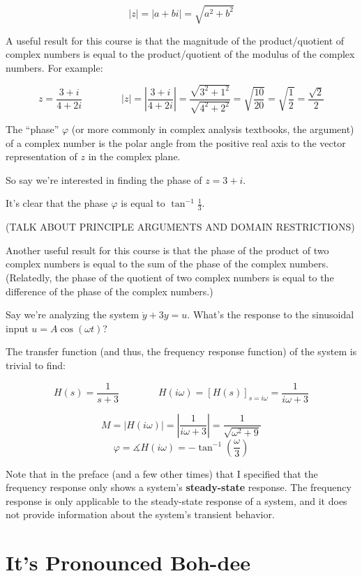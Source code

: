 \documentclass[
  letterpaper,
  DIV=11,
  numbers=noendperiod]{scrreprt}
\begin{document}
\[|z| = |a+bi| = \sqrt{a^2 + b^2}\]

A useful result for this course is that the magnitude of the
product/quotient of complex numbers is equal to the product/quotient of
the modulus of the complex numbers. For example:

\[z = \frac{3 + i}{4 + 2i} \qquad \qquad |z| = \left|\frac{3 + i}{4 + 2i} \right| = \frac{\sqrt{3^2+1^2}}{\sqrt{4^2+2^2}} = \sqrt{\frac{10}{20}} = \sqrt{\frac{1}{2}} = \frac{\sqrt{2}}{2}\]

The ``phase'' \(\varphi\) (or more commonly in complex analysis
textbooks, the argument) of a complex number is the polar angle from the
positive real axis to the vector representation of \(z\) in the complex
plane.

So say we're interested in finding the phase of \(z = 3 + i\).

It's clear that the phase \(\varphi\) is equal to
\(\tan^{-1} \frac{1}{3}\).

(TALK ABOUT PRINCIPLE ARGUMENTS AND DOMAIN RESTRICTIONS)

Another useful result for this course is that the phase of the product
of two complex numbers is equal to the sum of the phase of the complex
numbers. (Relatedly, the phase of the quotient of two complex numbers is
equal to the difference of the phase of the complex numbers.)

Say we're analyzing the system \(\dot{y} + 3y = u\). What's the response
to the sinusoidal input \(u = A \cos(\omega t)\)?

The transfer function (and thus, the frequency response function) of the
system is trivial to find:

\[H(s) = \frac{1}{s+3} \qquad \qquad H(i\omega) = \left[H(s) \right]_{s=i\omega} = \frac{1}{i\omega + 3}\]

\[M = \left|H(i\omega) \right| = \left|\frac{1}{i\omega + 3} \right| = \frac{1}{\sqrt{\omega^2 + 9}}\]
\[\varphi = \measuredangle H(i\omega) = -\tan^{-1} \left(\frac{\omega}{3} \right)\]

Note that in the preface (and a few other times) that I specified that
the frequency response only shows a system's \textbf{steady-state}
response. The frequency response is only applicable to the steady-state
response of a system, and it does not provide information about the
system's transient behavior.

\hypertarget{its-pronounced-boh-dee}{%
\section{It's Pronounced Boh-dee}\label{its-pronounced-boh-dee}}
\end{document}
